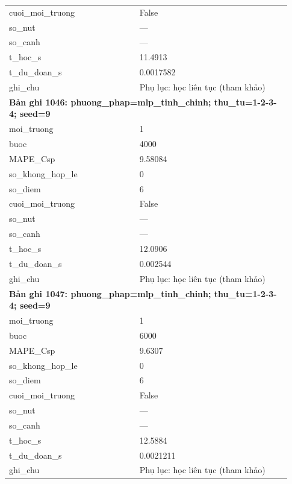 \begin{longtable}{p{0.43\linewidth}p{0.50\linewidth}}
cuoi\_\allowbreak moi\_\allowbreak truong & False \\
so\_\allowbreak nut & — \\
so\_\allowbreak canh & — \\
t\_\allowbreak hoc\_\allowbreak s & 11.4913 \\
t\_\allowbreak du\_\allowbreak doan\_\allowbreak s & 0.0017582 \\
ghi\_\allowbreak chu & Phụ lục: học liên tục (tham khảo) \\
\midrule
\multicolumn{2}{p{0.95\linewidth}}{\textbf{Bản ghi 1046: phuong\_phap=mlp\_tinh\_chinh; thu\_tu=1-2-3-4; seed=9}} \\
moi\_\allowbreak truong & 1 \\
buoc & 4000 \\
MAPE\_\allowbreak Csp & 9.58084 \\
so\_\allowbreak khong\_\allowbreak hop\_\allowbreak le & 0 \\
so\_\allowbreak diem & 6 \\
cuoi\_\allowbreak moi\_\allowbreak truong & False \\
so\_\allowbreak nut & — \\
so\_\allowbreak canh & — \\
t\_\allowbreak hoc\_\allowbreak s & 12.0906 \\
t\_\allowbreak du\_\allowbreak doan\_\allowbreak s & 0.002544 \\
ghi\_\allowbreak chu & Phụ lục: học liên tục (tham khảo) \\
\midrule
\multicolumn{2}{p{0.95\linewidth}}{\textbf{Bản ghi 1047: phuong\_phap=mlp\_tinh\_chinh; thu\_tu=1-2-3-4; seed=9}} \\
moi\_\allowbreak truong & 1 \\
buoc & 6000 \\
MAPE\_\allowbreak Csp & 9.6307 \\
so\_\allowbreak khong\_\allowbreak hop\_\allowbreak le & 0 \\
so\_\allowbreak diem & 6 \\
cuoi\_\allowbreak moi\_\allowbreak truong & False \\
so\_\allowbreak nut & — \\
so\_\allowbreak canh & — \\
t\_\allowbreak hoc\_\allowbreak s & 12.5884 \\
t\_\allowbreak du\_\allowbreak doan\_\allowbreak s & 0.0021211 \\
ghi\_\allowbreak chu & Phụ lục: học liên tục (tham khảo) \\

\end{longtable}
